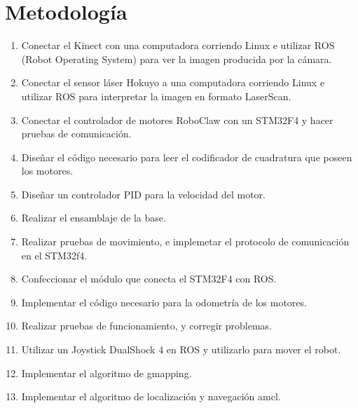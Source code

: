 \section{Metodología}
\label{metodología}

\begin{enumerate}  %
    \item Conectar el Kinect con una computadora corriendo Linux e utilizar ROS (Robot Operating System) para ver la imagen producida por la cámara.
    \item Conectar el sensor láser Hokuyo a una computadora corriendo Linux e utilizar ROS para interpretar la imagen en formato LaserScan.
    \item Conectar el controlador de motores RoboClaw con un STM32F4 y hacer pruebas de comunicación.
    \item Diseñar el código necesario para leer el codificador de cuadratura que poseen los motores.
    \item Diseñar un controlador PID para la velocidad del motor.
    \item Realizar el ensamblaje de la base.
    \item Realizar pruebas de movimiento, e implemetar el protocolo de comunicación en el STM32f4.
    \item Confeccionar el módulo que conecta el STM32F4 con ROS.
    \item Implementar el código necesario para la odometría de los motores.
    \item Realizar pruebas de funcionamiento, y corregir problemas.
    \item Utilizar un Joystick DualShock 4 en ROS y utilizarlo para mover el robot.
    \item Implementar el algoritmo de gmapping.
    \item Implementar el algoritmo de localización y navegación amcl.

\end{enumerate}
